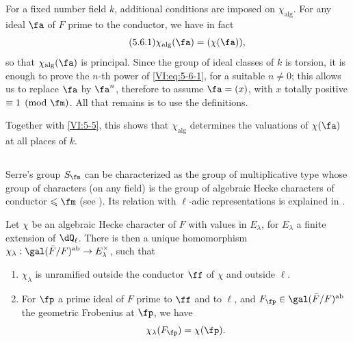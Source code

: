 \documentclass[oneside]{book}
\begin{document}
For a fixed number field $k$, additional conditions are 
imposed on $\chi_\text{alg}$. For any ideal $\fa$ of $F$ prime to the 
conductor, we have in fact 
\begin{equation*}\tag{5.6.1}\label{VI:eq:5-6-1}
  \chi_\text{alg}(\fa) = (\chi(\fa)) \text{,} 
\end{equation*}
so that $\chi_\text{alg}(\fa)$ is principal. Since the group of 
  ideal classes of $k$ is torsion, it is enough to prove the $n$-th power 
of \eqref{VI:eq:5-6-1}, for a suitable $n\ne 0$; this allows us 
to replace $\fa$ by $\fa^n$, therefore to assume $\fa=(x)$, with $x$ totally 
positive $\equiv 1\pmod\fm$. All that remains is to use the definitions. 

Together with \ref{VI:5-5}, this shows that $\chi_\text{alg}$ determines the 
valuations of $\chi(\fa)$ at all places of $k$. 





\subsection{}\label{VI:5-7}

Serre's group $S_\fm$ can be characterized as the 
group of multiplicative type whose group of characters (on any 
field) is the group of algebraic Hecke characters of conductor 
$\leqslant \fm$ (see \cite[II 2.1 et 2.2]{se68}). Its relation with 
$\ell$-adic representations is explained in \cite[II 2.3]{se68}.





\begin{theorem_}[{\cite{se68}}]\label{VI:5-8}
Let $\chi$ be an algebraic Hecke character of $F$ with values in $E_\lambda$, for 
$E_\lambda$ a finite extension of $\dQ_\ell$. There is then a unique 
  homomorphism $\chi_\lambda:\gal(\bar F/F)^\textnormal{ab} \to E_\lambda^\times$, such 
that 
\begin{enumerate}[\indent (i)]
  \item $\chi_\lambda$ is unramified outside the conductor $\ff$ of 
    $\chi$ and outside $\ell$. 
  \item For $\fp$ a prime ideal of $F$ prime to $\ff$ and to $\ell$, 
    and $F_\fp\in \gal(\bar F/F)^\textnormal{ab}$ the geometric Frobenius 
    at $\fp$, we have 
    \[
      \chi_\lambda(F_\fp) = \chi(\fp) \text{.}
    \] 
\end{enumerate}
\end{theorem_}
\end{document}
